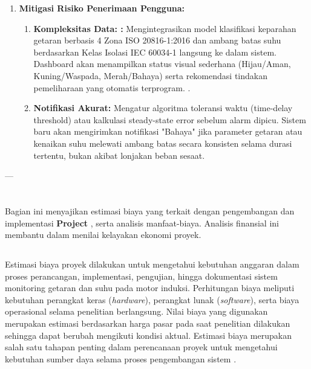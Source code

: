 \documentclass{elsinta}
\begin{document}
\begin{enumerate}
\begin{enumerate}
    \end{enumerate}
    \item \textbf{Mitigasi Risiko Penerimaan Pengguna:}
    \begin{enumerate}
        \item \textbf{Kompleksitas Data: :} Mengintegrasikan model klasifikasi keparahan getaran berbasis 4 Zona ISO 20816-1:2016 dan ambang batas suhu berdasarkan Kelas Isolasi IEC 60034-1 langsung ke dalam sistem. Dashboard akan menampilkan status visual sederhana (Hijau/Aman, Kuning/Waspada, Merah/Bahaya) serta rekomendasi tindakan pemeliharaan yang otomatis terprogram. .
        \item \textbf{Notifikasi Akurat:} Mengatur algoritma toleransi waktu (time-delay threshold) atau kalkulasi steady-state error sebelum alarm dipicu. Sistem baru akan mengirimkan notifikasi "Bahaya" jika parameter getaran atau kenaikan suhu melewati ambang batas secara konsisten selama durasi tertentu, bukan akibat lonjakan beban sesaat. 
 
    \end{enumerate}
\end{enumerate}

---

\section{\FinancialAnalysisTitle}

Bagian ini menyajikan estimasi biaya yang terkait dengan pengembangan dan implementasi \textbf{Project }, serta analisis manfaat-biaya. Analisis finansial ini membantu dalam menilai kelayakan ekonomi proyek.

\subsection{\CostEstimationTitle}
Estimasi biaya proyek dilakukan untuk mengetahui kebutuhan anggaran dalam proses perancangan, implementasi, pengujian, hingga dokumentasi sistem monitoring getaran dan suhu pada motor induksi. Perhitungan biaya meliputi kebutuhan perangkat keras (\textit{hardware}), perangkat lunak (\textit{software}), serta biaya operasional selama penelitian berlangsung. Nilai biaya yang digunakan merupakan estimasi berdasarkan harga pasar pada saat penelitian dilakukan sehingga dapat berubah mengikuti kondisi aktual. Estimasi biaya merupakan salah satu tahapan penting dalam perencanaan proyek untuk mengetahui kebutuhan sumber daya selama proses pengembangan sistem \cite{PMBOK,kerzner2022}.
\end{document}
